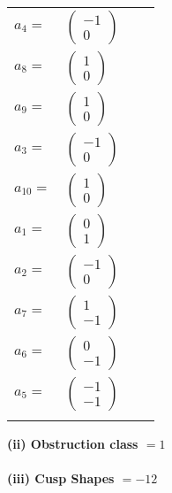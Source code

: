 \documentclass[1p]{elsarticle_modified}
\theoremstyle{definition}
\begin{document}
\begin{tabular}{m{7pt} m{180pt} m{7pt} m{180pt} }
\flushright $a_{4}=$&$\begin{pmatrix}-1\\0\end{pmatrix}$ \\
\flushright $a_{8}=$&$\begin{pmatrix}1\\0\end{pmatrix}$ \\
\flushright $a_{9}=$&$\begin{pmatrix}1\\0\end{pmatrix}$ \\
\flushright $a_{3}=$&$\begin{pmatrix}-1\\0\end{pmatrix}$ \\
\flushright $a_{10}=$&$\begin{pmatrix}1\\0\end{pmatrix}$ \\
\flushright $a_{1}=$&$\begin{pmatrix}0\\1\end{pmatrix}$ \\
\flushright $a_{2}=$&$\begin{pmatrix}-1\\0\end{pmatrix}$ \\
\flushright $a_{7}=$&$\begin{pmatrix}1\\-1\end{pmatrix}$ \\
\flushright $a_{6}=$&$\begin{pmatrix}0\\-1\end{pmatrix}$ \\
\flushright $a_{5}=$&$\begin{pmatrix}-1\\-1\end{pmatrix}$\\&\end{tabular}
\flushleft \textbf{(ii) Obstruction class $= 1$}\\~\\
\flushleft \textbf{(iii) Cusp Shapes $= -12$}\\~\\
\end{document}
